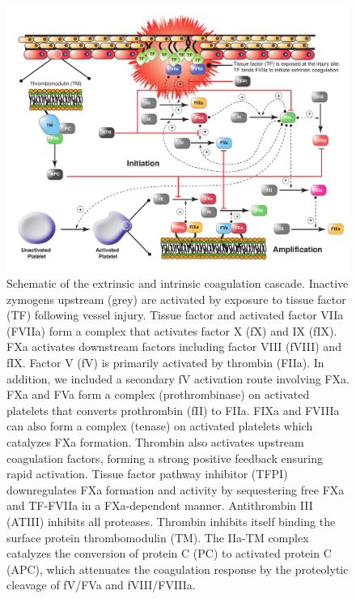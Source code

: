 \documentclass[12pt]{article}
\begin{document}
\clearpage

\begin{figure}[h]
\centering
\includegraphics[width=1.00\textwidth]{./figs/Figure_3_Coagulation_v4.pdf}
\caption{Schematic of the extrinsic and intrinsic coagulation cascade\cite{luan2007computationally}. Inactive zymogens upstream (grey) are activated by exposure to tissue factor (TF)  following vessel injury. Tissue factor and activated factor VIIa (FVIIa) form a complex that activates factor X (fX) and IX (fIX). FXa activates downstream factors including factor VIII (fVIII) and fIX. Factor V (fV) is primarily activated by thrombin (FIIa). In addition, we included a secondary fV activation route involving FXa. FXa and FVa form a complex (prothrombinase) on activated platelets that converts prothrombin (fII) to FIIa. FIXa and FVIIIa can also form a complex (tenase) on activated platelets which catalyzes FXa formation.  Thrombin also activates upstream coagulation factors, forming a strong positive feedback ensuring rapid activation. Tissue factor pathway inhibitor (TFPI) downregulates FXa formation and activity by sequestering free FXa and TF-FVIIa in a FXa-dependent manner. Antithrombin III (ATIII)  inhibits all proteases. Thrombin inhibits itself binding the surface protein thrombomodulin (TM). The IIa-TM complex catalyzes the conversion of protein C (PC) to activated protein C (APC), which attenuates the coagulation response by the proteolytic cleavage of fV/FVa and fVIII/FVIIIa. }\label{fig-coagulation-network}
\end{figure}

\clearpage
\end{document}
